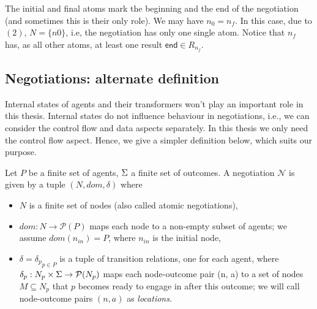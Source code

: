 The initial and final atoms mark the beginning and the end of the negotiation (and sometimes this is their only role). We may have $n_0 = n_f$. In this case, due to $(2)$, $N = \{n0\}$, i.e, the negotiation has only one single atom. Notice that $n_f$ has, as all other atoms, at least one result $\textsf{end} \in R_{n_f}$.




\subsection{Negotiations: alternate definition}

Internal states of agents and their transformers won’t play an important role in this thesis. Internal states do not influence behaviour in negotiations, i.e., we can consider the control flow and data aspects separately. In this thesis we only need the control flow aspect. Hence, we give a simpler definition below, which suits our purpose.


\begin{definition}
Let $P$ be a finite set of agents, $\S$ a finite set of outcomes. A \textsf{negotiation} $\mathcal{N}$ is given by a tuple $(N, dom, \delta)$ where
\begin{itemize}
\item $N$ is a finite set of nodes (also called atomic negotiations),
\item $dom : N \rightarrow \mathcal{P}(P)$ maps each node to a non-empty subset of agents; we assume $dom(n_{in})=P$, where $n_{in}$ is the initial node,
\item $\delta = {\delta_p}_{p \in P}$ is a tuple of transition relations, one for each agent, where $\delta_p : N_p \times \S \rightarrow \mathcal{P}(N_p)$ maps each node-outcome pair (n, a) to a set of nodes $M \subseteq N_p$ that $p$ becomes ready to engage in after this outcome; we will call node-outcome pairs $(n, a)$ as \textit{locations}.
\end{itemize}
\end{definition}

